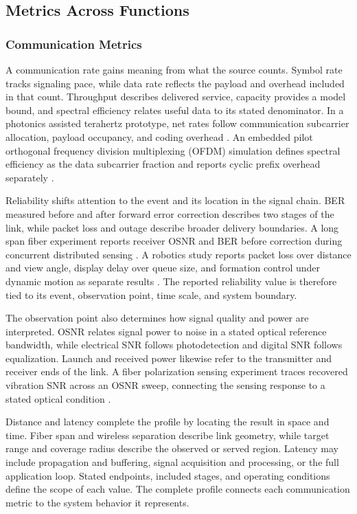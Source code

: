 \subsection{Metrics Across Functions}

\subsubsection{Communication Metrics}

A communication rate gains meaning from what the source counts. Symbol rate
tracks signaling pace, while data rate reflects the payload and overhead
included in that count. Throughput describes delivered service, capacity
provides a model bound, and spectral efficiency relates useful data to its
stated denominator. In a photonics assisted terahertz prototype, net rates
follow communication subcarrier allocation, payload occupancy, and coding
overhead
\cite{OISAC_SCR01054}. An embedded pilot orthogonal frequency division
multiplexing (OFDM) simulation defines spectral efficiency as the data
subcarrier fraction and reports cyclic prefix overhead
separately
\cite{OISAC_SCR00007}.

Reliability shifts attention to the event and its location in the signal chain.
BER measured before and after forward error correction describes two stages of
the link, while packet loss and outage describe broader delivery boundaries. A
long span fiber experiment reports receiver OSNR and BER before correction
during concurrent distributed sensing
\cite{OISAC_SCR01180}. A robotics study reports packet loss over distance and
view angle, display delay over queue size, and formation control under dynamic
motion as separate results \cite{OISAC_SCR00910}. The reported reliability value
is therefore tied to its event, observation point, time scale, and system boundary.

The observation point also determines how signal quality and power are
interpreted. OSNR relates signal power to noise in a stated optical reference
bandwidth, while electrical SNR follows photodetection and digital SNR follows
equalization. Launch and received power likewise refer to the transmitter and
receiver ends of the link. A fiber polarization sensing experiment traces
recovered vibration SNR across an OSNR sweep, connecting the
sensing response to a stated optical condition
\cite{OISAC_SCR00220}.

Distance and latency complete the profile by locating the result in space and
time. Fiber span and wireless separation describe link geometry, while target
range and coverage radius describe the observed or served region. Latency may
include propagation and buffering, signal acquisition and processing, or the
full application loop. Stated endpoints, included stages, and operating
conditions define the scope of each value. The complete profile connects each
communication metric to the system behavior it represents.

